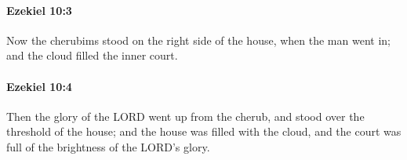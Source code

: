 		\paragraph{Ezekiel 10:3} %
			\label{EZEKIEL-10-3}

			Now the cherubims stood on the right side of the house, when the man went in; and the cloud filled the inner court.


		\paragraph{Ezekiel 10:4} %
			\label{EZEKIEL-10-4}

			Then the glory of the LORD went up from the cherub, and stood over the threshold of the house; and the house was filled with the cloud, and the court was full of the brightness of the LORD’s glory.


